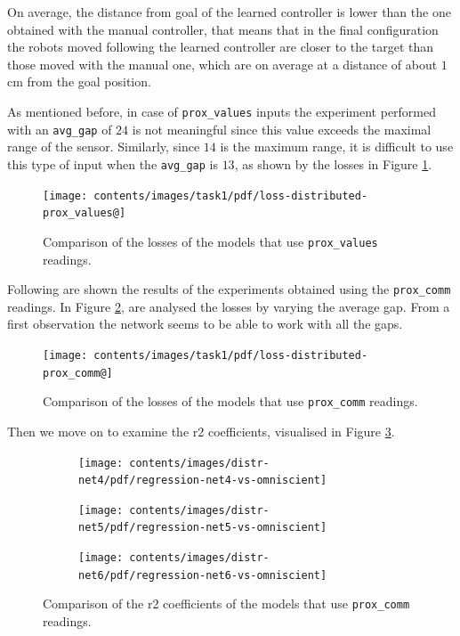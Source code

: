 On average, the distance from goal of the learned controller is lower than the one 
obtained with the manual controller, that means that in the final configuration 
the robots moved following the learned controller are closer to the target than 
those moved with the manual one, which are on average at a distance of about 
$1$ \gls{cm} from the goal position. 

As mentioned before, in case of \texttt{prox\_values} inputs the 
experiment performed with an \texttt{avg\_gap} of $24$ is not meaningful since 
this value exceeds the maximal range of the sensor. Similarly, since $14$ is the 
maximum range, it is difficult to use this type of input when the \texttt{avg\_gap}  
is $13$, as shown by the losses in Figure \ref{fig:distlossprox_values}.
\begin{figure}[!htb]
	\centering
	\texttt{[image: contents/images/task1/pdf/loss-distributed-prox\_values@]}%
	\caption{Comparison of the losses of the models that use \texttt{prox\_values} 
		readings.}
	\label{fig:distlossprox_values}
\end{figure}

Following are shown the results of the experiments obtained using the 
\texttt{prox\_comm} readings. In Figure \ref{fig:distlossprox_comm}, are 
analysed the losses by varying the average gap. From a first observation the 
network seems to be able to work with all the gaps.
\begin{figure}[!htb]
	\centering
	\texttt{[image: contents/images/task1/pdf/loss-distributed-prox\_comm@]}%
	\caption{Comparison of the losses of the models that use \texttt{prox\_comm} 
	readings.}
	\label{fig:distlossprox_comm}
\end{figure}

Then we move on to examine the \gls{r2} coefficients, visualised in Figure 
\ref{fig:net456r2}.
\begin{figure}[!htb]
	\begin{center}
		\begin{subfigure}[h]{0.47\textwidth}
			\texttt{[image: contents/images/distr-net4/pdf/regression-net4-vs-omniscient]}%
		\end{subfigure}
		\hfill
		\begin{subfigure}[h]{0.47\textwidth}
			\texttt{[image: contents/images/distr-net5/pdf/regression-net5-vs-omniscient]}%
		\end{subfigure}
	\end{center}
	\begin{center}
		\begin{subfigure}[h]{0.47\textwidth}
			\texttt{[image: contents/images/distr-net6/pdf/regression-net6-vs-omniscient]}
		\end{subfigure}
	\end{center}
	\caption[Comparison of the \gls{r2} coefficient for \texttt{prox\_comm} 
	readings.]{Comparison of the \gls{r2} coefficients of the models that use 
	\texttt{prox\_comm} readings.}
	\label{fig:net456r2}
\end{figure}


